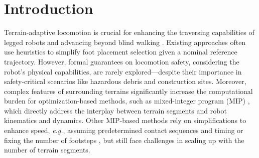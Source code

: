 \documentclass[letterpaper, 10 pt, conference]{ieeeconf}
\begin{document}
\section{Introduction}




Terrain-adaptive locomotion is crucial for enhancing the traversing capabilities of legged robots and advancing beyond blind walking \cite{di2018dynamic,kim2019highly, zhou2022momentum}. Existing approaches often use heuristics \cite{fankhauser2018robust,jenelten2020perceptive,agrawal2022vision,grandia2023perceptive, asselmeier2024hierarchical} to simplify foot placement selection given a nominal reference trajectory. However, formal guarantees on locomotion safety, considering the robot's physical capabilities, are rarely explored—despite their importance in safety-critical scenarios like hazardous debris and construction sites. Moreover, complex features of surrounding terrains significantly increase the computational burden for optimization-based methods, such as mixed-integer program (MIP) \cite{valenzuela2016mixed,shirai2022simultaneous,jiang2023locomotion}, which directly address the interplay between terrain segments and robot kinematics and dynamics. Other MIP-based methods rely on simplifications to enhance speed, \textit{e.g.}, assuming predetermined contact sequences and timing \cite{deits2014footstep,ponton2016convex,ding2020kinodynamic,tonneau2020sl1m,risbourg2022real,acosta2023bipedal} or fixing the number of footsteps \cite{aceituno2017simultaneous}, but still face challenges in scaling up with the number of terrain segments.
\end{document}

